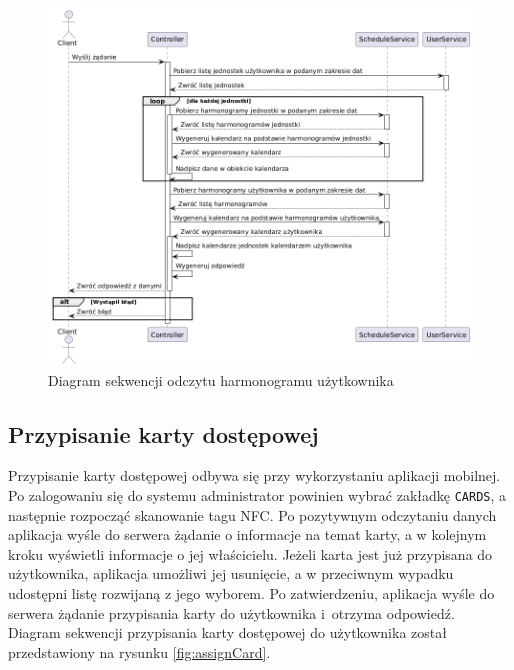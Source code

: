 \begin{figure}[H]
    \centering
    \includegraphics[width=\textwidth]{graf/schSeq.png}
    \caption{Diagram sekwencji odczytu harmonogramu użytkownika}
    \label{fig:scheduleSequence}
\end{figure}

\subsection{Przypisanie  karty dostępowej}
\label{sec:addNfc}

Przypisanie karty dostępowej odbywa się przy wykorzystaniu aplikacji mobilnej. Po zalogowaniu się do systemu administrator powinien wybrać zakładkę \texttt{CARDS}, a następnie rozpocząć skanowanie tagu NFC. Po pozytywnym odczytaniu danych aplikacja wyśle do serwera żądanie o informacje na temat karty, a w kolejnym kroku wyświetli informacje o jej właścicielu. Jeżeli karta jest już przypisana do użytkownika, aplikacja umożliwi jej usunięcie, a w przeciwnym wypadku udostępni listę rozwijaną z jego wyborem. Po zatwierdzeniu, aplikacja wyśle do serwera żądanie przypisania karty do użytkownika i~otrzyma odpowiedź. Diagram sekwencji przypisania karty dostępowej do użytkownika został przedstawiony na rysunku \ref{fig:assignCard}.

